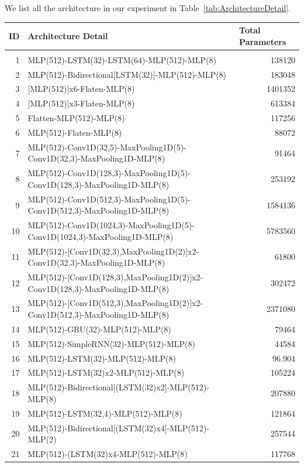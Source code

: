 \documentclass{article}
\begin{document}
We list all the architecture in our experiment in Table~\ref{tab:ArchitectureDetail}.

\begin{table}[htbp]
  \centering
   \begin{tabular}{rp{32em}r}
   \multicolumn{1}{l}{ID} & Architecture Detail & \multicolumn{1}{l}{Total Parameters} \\
   \hline
	\\
1  & MLP(512)-LSTM(32)-LSTM(64)-MLP(512)-MLP(8) & 138120 \\
2  & MLP(512)-Bidirectional[LSTM(32)]-MLP(512)-MLP(8) & 183048 \\
3  & [MLP(512)]x6-Flaten-MLP(8) & 1401352 \\
4  & [MLP(512)]x3-Flaten-MLP(8) & 613384 \\
5  & Flatten-MLP(512)-MLP(8) & 117256 \\
6  & MLP(512)-Flaten-MLP(8) & 88072 \\
7  & MLP(512)-Conv1D(32,5)-MaxPooling1D(5)-Conv1D(32,3)-MaxPooling1D-MLP(8) & 91464 \\
8  & MLP(512)-Conv1D(128,3)-MaxPooling1D(5)-Conv1D(128,3)-MaxPooling1D-MLP(8) & 253192 \\
9  & MLP(512)-Conv1D(512,3)-MaxPooling1D(5)-Conv1D(512,3)-MaxPooling1D-MLP(8) & 1584136 \\
10 & MLP(512)-Conv1D(1024,3)-MaxPooling1D(5)-Conv1D(1024,3)-MaxPooling1D-MLP(8) & 5783560 \\
11 & MLP(512)-[Conv1D(32,3),MaxPooling1D(2)]x2-Conv1D(32,3)-MaxPooling1D-MLP(8) & 61800 \\
12 & MLP(512)-[Conv1D(128,3),MaxPooling1D(2)]x2-Conv1D(128,3)-MaxPooling1D-MLP(8) & 302472 \\
13 & MLP(512)-[Conv1D(512,3),MaxPooling1D(2)]x2-Conv1D(512,3)-MaxPooling1D-MLP(8) & 2371080 \\
14 & MLP(512)-GRU(32)-MLP(512)-MLP(8) & 79464 \\
15 & MLP(512)-SimpleRNN(32)-MLP(512)-MLP(8) & 44584 \\
16 & MLP(512)-LSTM(32)-MLP(512)-MLP(8) & 96.904 \\
17 & MLP(512)-LSTM(32)x2-MLP(512)-MLP(8) & 105224 \\
18 & MLP(512)-Bidirectional[(LSTM(32)x2]-MLP(512)-MLP(8) & 207880 \\
19 & MLP(512)-LSTM(32,4)-MLP(512)-MLP(8) & 121864 \\
20 & MLP(512)-Bidirectional[(LSTM(32)x4]-MLP(512)-MLP(2) & 257544 \\
21 & MLP(512)-(LSTM(32)x4-MLP(512)-MLP(8) & 117768 \\

\end{tabular}
\end{table}
\end{document}
